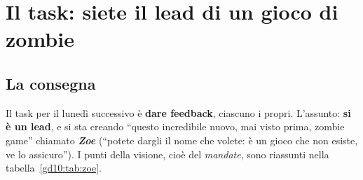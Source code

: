\section{Il task: siete il lead di un gioco di zombie}
\label{gd10:sec:task-zoe}



\subsection{La consegna}

Il task per il lunedì successivo è \textbf{dare feedback}, ciascuno i propri.
L'assunto: \textbf{si è un lead}, e si sta creando ``questo incredibile
nuovo, mai visto prima, zombie game'' chiamato \textbf{\emph{Zoe}} (``potete
dargli il nome che volete: è un gioco che non esiste, ve lo assicuro''). I
punti della visione, cioè del \emph{mandate}, sono riassunti nella
tabella~\ref{gd10:tab:zoe}.

